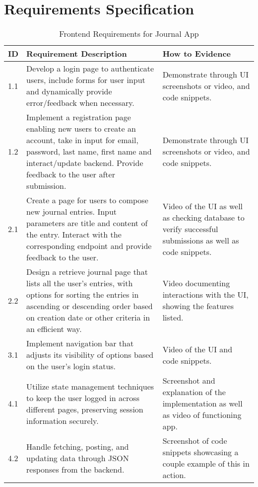\section{Requirements Specification}

\begin{table}[H]
\centering
\begin{tabular}{|l|p{8cm}|p{4cm}|}
\hline
\textbf{ID} & \textbf{Requirement Description} & \textbf{How to Evidence}\\ \hline
1.1 & Develop a login page to authenticate users, include forms for user input and dynamically provide error/feedback when necessary. & Demonstrate through UI screenshots or video, and code snippets. \\ \hline

1.2 & Implement a registration page enabling new users to create an account, take in input for email, password, last name, first name and interact/update backend. Provide feedback to the user after submission. & Demonstrate through UI screenshots or video, and code snippets.\\ \hline

2.1 & Create a page for users to compose new journal entries. Input parameters are title and content of the entry. Interact with the corresponding endpoint and provide feedback to the user.& Video of the UI as well as checking database to verify successful submissions as well as code snippets.\\ \hline

2.2 & Design a retrieve journal page that lists all the user’s entries, with options for sorting the entries in ascending or descending order based on creation date or other criteria in an efficient way. & Video documenting interactions with the UI, showing the features listed.\\ \hline

3.1 & Implement navigation bar that adjusts its visibility of options based on the user's login status. & Video of the UI and code snippets.\\ \hline

4.1 & Utilize state management techniques to keep the user logged in across different pages, preserving session information securely. & Screenshot and explanation of the implementation as well as video of functioning app.\\ \hline

4.2 & Handle fetching, posting, and updating data through JSON responses from the backend. & Screenshot of code snippets showcasing a couple example of this in action. \\ \hline
\end{tabular}
\caption{Frontend Requirements for Journal App}
\end{table}



